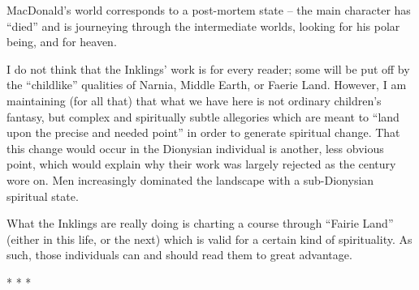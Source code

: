 MacDonald's world corresponds to a post-mortem state -- the main character has ``died'' and is journeying through the intermediate worlds, looking for his polar being, and for heaven. 

I do not think that the Inklings' work is for every reader; some will be put off by the ``childlike'' qualities of Narnia, Middle Earth, or Faerie Land. However, I am maintaining (for all that) that what we have here is not ordinary children's fantasy, but complex and spiritually subtle allegories which are meant to ``land upon the precise and needed point'' in order to generate spiritual change. That this change would occur in the Dionysian individual is another, less obvious point, which would explain why their work was largely rejected as the century wore on. Men increasingly dominated the landscape with a sub-Dionysian spiritual state. 

What the Inklings are really doing is charting a course through ``Fairie Land'' (either in this life, or the next) which is valid for a certain kind of spirituality. As such, those individuals can and should read them to great advantage.



\begin{center}* * *\end{center}

